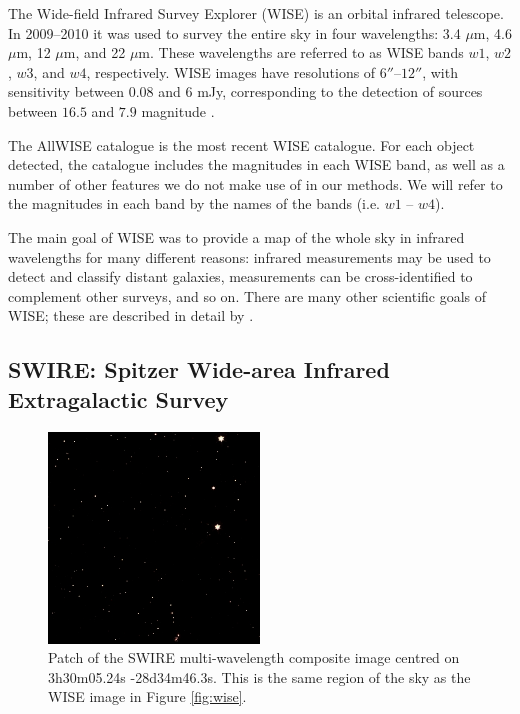            The Wide-field Infrared Survey Explorer (WISE) is an orbital
            infrared telescope. In 2009--2010 it was used to survey the entire
            sky in four wavelengths: 3.4 $\mu$m, 4.6 $\mu$m, 12 $\mu$m, and 22
            $\mu$m. These wavelengths are referred to as WISE bands $w1$, $w2$,
            $w3$, and $w4$, respectively. WISE images have resolutions of
            $6''$--$12''$, with sensitivity between $0.08$ and $6$ mJy,
            corresponding to the detection of sources between $16.5$ and $7.9$
            magnitude \citep{wright10}.

            The AllWISE catalogue \citep{cutri13} is the most recent WISE
            catalogue. For each object detected, the catalogue includes the
            magnitudes in each WISE band, as well as a number of other features
            we do not make use of in our methods. We will refer to the
            magnitudes in each band by the names of the bands (i.e. $w1$ --
            $w4$).

            The main goal of WISE was to provide a map of the whole sky in
            infrared wavelengths for many different reasons: infrared
            measurements may be used to detect and classify distant galaxies,
            measurements can be cross-identified to complement other surveys,
            and so on. There are many other scientific goals of WISE; these are
            described in detail by \citet{wright10}.

        \subsection{SWIRE: Spitzer Wide-area Infrared Extragalactic Survey}
        \label{sec:swire}

            \begin{figure}
                \centering
                \includegraphics[width=0.5\textwidth]{images/swire_small.jpg}
                \caption{Patch of the SWIRE multi-wavelength composite image
                    centred on 3h30m05.24s -28d34m46.3s. This is the same region
                    of the sky as the WISE image in Figure \ref{fig:wise}.}
            \end{figure}


